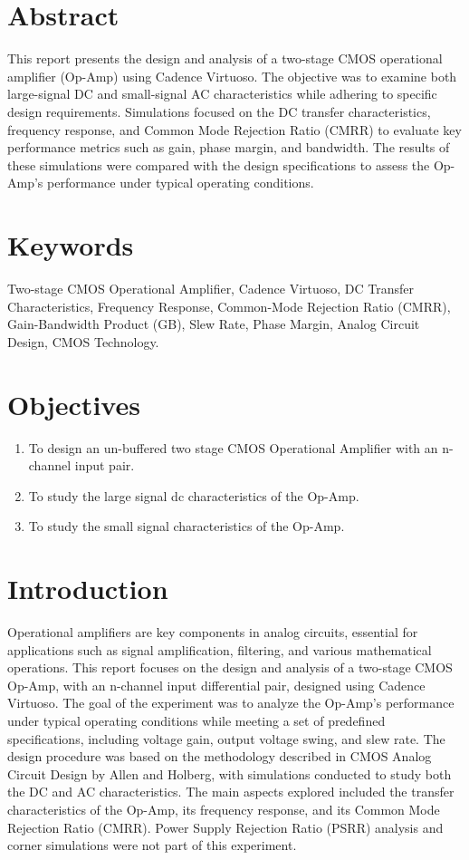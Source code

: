 \documentclass[11pt]{article}
\begin{document}
\tableofcontents
\listoffigures
\pagestyle{fancy}
\fancyhead{}
\fancyfoot{}
\newpage
\section{Abstract}
This report presents the design and analysis of a two-stage CMOS operational amplifier (Op-Amp) using Cadence Virtuoso. The objective was to examine both large-signal DC and small-signal AC characteristics while adhering to specific design requirements. Simulations focused on the DC transfer characteristics, frequency response, and Common Mode Rejection Ratio (CMRR) to evaluate key performance metrics such as gain, phase margin, and bandwidth. The results of these simulations were compared with the design specifications to assess the Op-Amp's performance under typical operating conditions.
\section{Keywords}
Two-stage CMOS Operational Amplifier, Cadence Virtuoso, DC Transfer Characteristics, Frequency Response, Common-Mode Rejection Ratio (CMRR), Gain-Bandwidth Product (GB), Slew Rate, Phase Margin, Analog Circuit Design, CMOS Technology.
\section{Objectives}
\begin{enumerate}
    \item To design an un-buffered two stage CMOS Operational Amplifier with an n-channel input pair.
    \item To study the large signal dc characteristics of the Op-Amp.
    \item To study the small signal characteristics of the Op-Amp.
\end{enumerate}
\section{Introduction}
Operational amplifiers are key components in analog circuits, essential for applications such as signal amplification, filtering, and various mathematical operations. This report focuses on the design and analysis of a two-stage CMOS Op-Amp, with an n-channel input differential pair, designed using Cadence Virtuoso. The goal of the experiment was to analyze the Op-Amp's performance under typical operating conditions while meeting a set of predefined specifications, including voltage gain, output voltage swing, and slew rate. The design procedure was based on the methodology described in CMOS Analog Circuit Design by Allen and Holberg, with simulations conducted to study both the DC and AC characteristics. The main aspects explored included the transfer characteristics of the Op-Amp, its frequency response, and its Common Mode Rejection Ratio (CMRR). Power Supply Rejection Ratio (PSRR) analysis and corner simulations were not part of this experiment.
\end{document}
